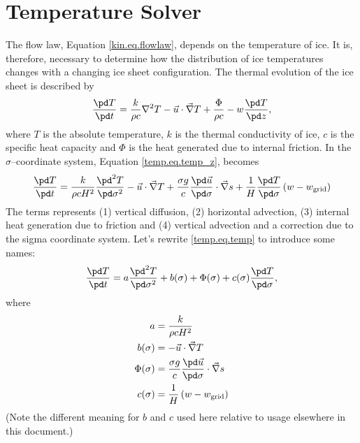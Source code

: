 \section{Temperature Solver}
The flow law, Equation \eqref{kin.eq.flowlaw}, depends on the temperature of ice. It is, therefore, necessary to determine how the distribution of ice temperatures changes with a changing ice sheet configuration. The thermal evolution of the ice sheet is described by
\begin{equation}
  \label{temp.eq.temp_z}
  \frac{\pd T}{\pd t}=\frac{k}{\rho c}\nabla^2T-\vec{u}\cdot\vec\nabla T+\frac\Phi{\rho c}-w\frac{\pd T}{\pd z},
\end{equation}
where $T$ is the absolute temperature, $k$ is the thermal conductivity of ice, $c$ is the specific heat capacity and $\Phi$ is the heat generated due to internal friction. In the $\sigma$--coordinate system, Equation \eqref{temp.eq.temp_z}, becomes
\begin{equation}
  \label{temp.eq.temp}
  \frac{\pd T}{\pd t} = \frac{k}{\rho cH^2}\frac{\pd^2T}{\pd\sigma^2} - \vec{u}\cdot\vec\nabla T + \frac{\sigma g}c\frac{\pd \vec{u}}{\pd\sigma}\cdot\vec\nabla s + \frac1H\frac{\pd T}{\pd\sigma}\left(w-w_{\text{grid}}\right)
\end{equation}
The terms represents (1) vertical diffusion, (2) horizontal advection, (3) internal heat generation due to friction and (4) vertical advection and a correction due to the sigma coordinate system. Let's rewrite \eqref{temp.eq.temp} to introduce some names:
\begin{equation}
  \label{temp.eq.temp2}
  \frac{\pd T}{\pd t} = a\frac{\pd^2T}{\pd\sigma^2} +b(\sigma) + \Phi(\sigma) + c(\sigma)\frac{\pd T}{\pd\sigma},
\end{equation}
where
\begin{subequations}
  \begin{align}
    a&=\frac{k}{\rho cH^2} \\
    \label{temp.eq.hadv}
    b(\sigma)&=-\vec{u}\cdot\vec\nabla T\\
    \Phi(\sigma)&=\frac{\sigma g}c\frac{\pd \vec{u}}{\pd\sigma}\cdot\vec\nabla s \\
    c(\sigma)&=\frac1H\left(w-w_{\text{grid}}\right)
  \end{align}
\end{subequations}
(Note the different meaning for $b$ and $c$ used here relative to usage elsewhere in this document.)

